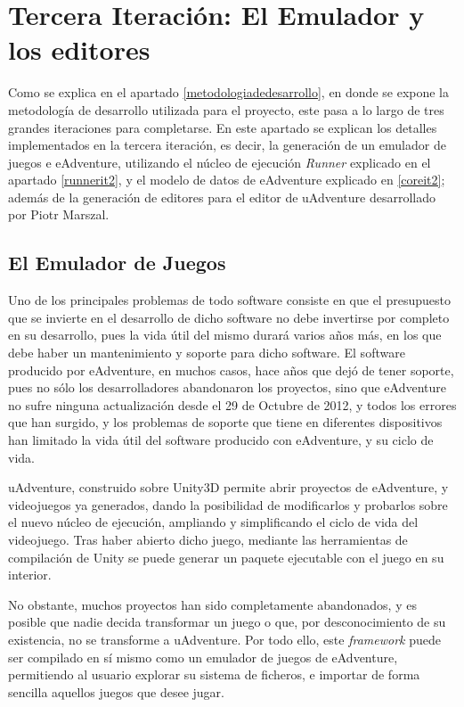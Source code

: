 \chapter{Tercera Iteración: El Emulador y los editores}

Como se explica en el apartado \ref{metodologiadedesarrollo}, en donde se expone la metodología de desarrollo utilizada para el proyecto, este pasa a lo largo de tres grandes iteraciones para completarse. En este apartado se explican los detalles implementados en la tercera iteración, es decir, la generación de un emulador de juegos e eAdventure, utilizando el núcleo de ejecución \textit{Runner} explicado en el apartado \ref{runnerit2}, y el modelo de datos de eAdventure explicado en \ref{coreit2}; además de la generación de editores para el editor de uAdventure desarrollado por Piotr Marszal. 

\section{El Emulador de Juegos}
\label{emulatorit3}

Uno de los principales problemas de todo software consiste en que el presupuesto que se invierte en el desarrollo de dicho software no debe invertirse por completo en su desarrollo, pues la vida útil del mismo durará varios años más, en los que debe haber un mantenimiento y soporte para dicho software. El software producido por eAdventure, en muchos casos, hace años que dejó de tener soporte, pues no sólo los desarrolladores abandonaron los proyectos, sino que eAdventure no sufre ninguna actualización desde el 29 de Octubre de 2012, y todos los errores que han surgido, y los problemas de soporte que tiene en diferentes dispositivos han limitado la vida útil del software producido con eAdventure, y su ciclo de vida.

uAdventure, construido sobre Unity3D permite abrir proyectos de eAdventure, y videojuegos ya generados, dando la posibilidad de modificarlos y probarlos sobre el nuevo núcleo de ejecución, ampliando y simplificando el ciclo de vida del videojuego. Tras haber abierto dicho juego, mediante las herramientas de compilación de Unity se puede generar un paquete ejecutable con el juego en su interior.

No obstante, muchos proyectos han sido completamente abandonados, y es posible que nadie decida transformar un juego o que, por desconocimiento de su existencia, no se transforme a uAdventure. Por todo ello, este \textit{framework} puede ser compilado en sí mismo como un emulador de juegos de eAdventure, permitiendo al usuario explorar su sistema de ficheros, e importar de forma sencilla aquellos juegos que desee jugar.

